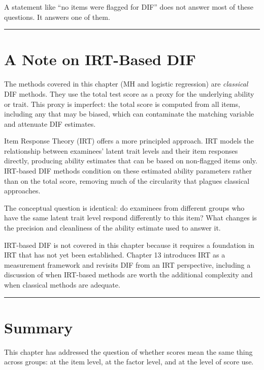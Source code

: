 \documentclass[
  11pt,
  letterpaper,
]{scrbook}
\begin{document}
A statement like ``no items were flagged for DIF'' does not answer most
of these questions. It answers one of them.

\begin{center}\rule{0.5\linewidth}{0.5pt}\end{center}

\section{A Note on IRT-Based DIF}\label{a-note-on-irt-based-dif}

The methods covered in this chapter (MH and logistic regression) are
\emph{classical} DIF methods. They use the total test score as a proxy
for the underlying ability or trait. This proxy is imperfect: the total
score is computed from all items, including any that may be biased,
which can contaminate the matching variable and attenuate DIF estimates.

Item Response Theory (IRT) offers a more principled approach. IRT models
the relationship between examinees' latent trait levels and their item
responses directly, producing ability estimates that can be based on
non-flagged items only. IRT-based DIF methods condition on these
estimated ability parameters rather than on the total score, removing
much of the circularity that plagues classical approaches.

The conceptual question is identical: do examinees from different groups
who have the same latent trait level respond differently to this item?
What changes is the precision and cleanliness of the ability estimate
used to answer it.

IRT-based DIF is not covered in this chapter because it requires a
foundation in IRT that has not yet been established. Chapter 13
introduces IRT as a measurement framework and revisits DIF from an IRT
perspective, including a discussion of when IRT-based methods are worth
the additional complexity and when classical methods are adequate.

\begin{center}\rule{0.5\linewidth}{0.5pt}\end{center}

\section{Summary}\label{summary}

This chapter has addressed the question of whether scores mean the same
thing across groups: at the item level, at the factor level, and at the
level of score use.
\end{document}
